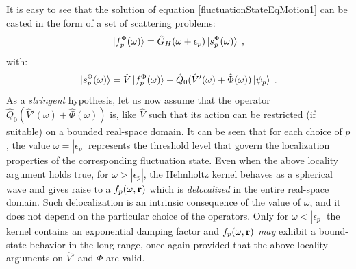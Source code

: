 \documentclass[reprint,aps,prb]{revtex4-1}
\renewcommand{\r}{{\bf r}}
\newcommand{\eps}{\epsilon}
\newcommand{\be}{\begin{equation}}
\newcommand{\ee}{\end{equation}}
\newcommand{\nn}{\notag}
\newcommand{\lb}{\label}
\newcommand{\op}[1]{\hat {#1}}
\begin{document}
It is easy to see that the solution of equation \eqref{fluctuationStateEqMotion1} can be casted in the form of
a set of scattering problems:
\be\lb{rhoPrimeFluctuationStateDef2}
\ket{f_p^\Phi(\omega)} = \op G_H(\omega+\epsilon_p)\ket{s_p^\Phi(\omega)} \;,
\ee
with:%
\be
\ket{s_p^\Phi(\omega)} =  \op V\ket{f_p^\Phi(\omega)} + \op Q_0(\op V'(\omega) + \op \Phi(\omega))\ket{\psi_p} \;.\nn
\ee
As a \emph{stringent} hypothesis, 
let us now assume that the operator $\op Q_0(\op V'(\omega) + \op \Phi(\omega))$ is, like $\op V$ such that its action
can be restricted (if suitable) on a bounded real-space domain.
It can be seen that for each choice of $p$, the value $\omega = |\eps_p|$ represents the threshold level 
that govern the localization properties of the corresponding 
fluctuation state. Even when the above locality argument holds true, for $\omega > |\eps_p|$, 
the Helmholtz kernel behaves as a spherical wave and  gives raise to a $f_p(\omega,\r)$ which is \emph{delocalized} in the entire real-space domain.
Such delocalization is an intrinsic consequence of the value of $\omega$, and it does not depend on the particular
choice of the operators.
Only for $\omega < |\eps_p|$ the kernel contains an exponential damping factor and $f_p(\omega,\r)$ \emph{may} 
exhibit a bound-state behavior in the long range, once again provided that the above locality arguments on $\op V'$ and $\Phi$ are valid.
\end{document}
